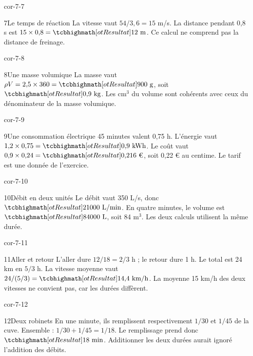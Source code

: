 \begin{blocLivre}{cor-7-7}\begin{corrige}{7}{Le temps de réaction}
La vitesse vaut $54/3{,}6=15$ m/s. La distance pendant 0,8 s est $15\times0{,}8=\res{12\text{ m}}$. Ce calcul ne comprend pas la distance de freinage.
\end{corrige}\end{blocLivre}
\begin{blocLivre}{cor-7-8}\begin{corrige}{8}{Une masse volumique}
La masse vaut $\rho V=2{,}5\times360=\res{900\text{ g}}$, soit $\res{0{,}9\text{ kg}}$. Les cm$^3$ du volume sont cohérents avec ceux du dénominateur de la masse volumique.
\end{corrige}\end{blocLivre}
\begin{blocLivre}{cor-7-9}\begin{corrige}{9}{Une consommation électrique}
45 minutes valent 0,75 h. L’énergie vaut $1{,}2\times0{,}75=\res{0{,}9\text{ kWh}}$. Le coût vaut $0{,}9\times0{,}24=\res{0{,}216\text{ €}}$, soit 0,22 € au centime. Le tarif est une donnée de l’exercice.
\end{corrige}\end{blocLivre}
\begin{blocLivre}{cor-7-10}\begin{corrige}{10}{Débit en deux unités}
Le débit vaut 350 L/s, donc $\res{21000\text{ L/min}}$. En quatre minutes, le volume est $\res{84000\text{ L}}$, soit 84 m$^3$. Les deux calculs utilisent la même durée.
\end{corrige}\end{blocLivre}
\begin{blocLivre}{cor-7-11}\begin{corrige}{11}{Aller et retour}
L’aller dure $12/18=2/3$ h ; le retour dure 1 h. Le total est 24 km en $5/3$ h. La vitesse moyenne vaut $24/(5/3)=\res{14{,}4\text{ km/h}}$. La moyenne 15 km/h des deux vitesses ne convient pas, car les durées diffèrent.
\end{corrige}\end{blocLivre}
\begin{blocLivre}{cor-7-12}\begin{corrige}{12}{Deux robinets}
En une minute, ils remplissent respectivement $1/30$ et $1/45$ de la cuve. Ensemble : $1/30+1/45=1/18$. Le remplissage prend donc $\res{18\text{ min}}$. Additionner les deux durées aurait ignoré l’addition des débits.
\end{corrige}\end{blocLivre}

